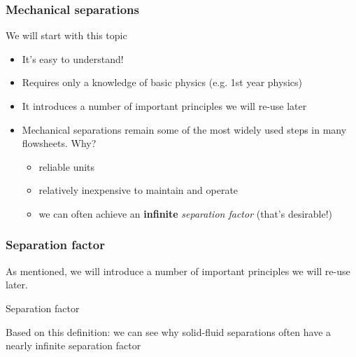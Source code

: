 \begin{frame}\frametitle{Mechanical separations}
	We will start with this topic
	\begin{itemize}
		\item	It's easy to understand!
		\item	Requires only a knowledge of basic physics (e.g. 1st year physics)
		\item	It introduces a number of important principles we will re-use later
		\item	Mechanical separations remain some of the most widely used steps in many flowsheets. Why?
		\begin{itemize}
			\item	reliable units
			\item	relatively inexpensive to maintain and operate
			\item	we can often achieve an \textbf{infinite} \emph{separation factor} (that's desirable!)
		\end{itemize}
	\end{itemize}
\end{frame}

\begin{frame}\frametitle{Separation factor}
	As mentioned, we will introduce a number of important principles we will re-use later.
	
	\begin{exampleblock}{Separation factor}
	\end{exampleblock}
	
	Based on this definition: we can see why solid-fluid separations often have a nearly infinite separation factor
\end{frame}

